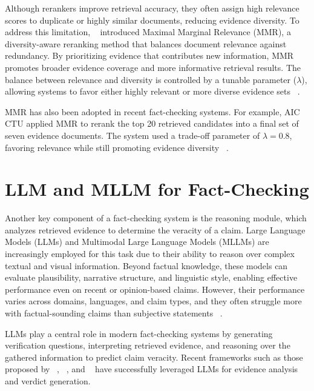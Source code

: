 Although rerankers improve retrieval accuracy, they often assign high relevance scores to duplicate or highly similar documents, reducing evidence diversity. To address this limitation, ~\citet{Carbonell1998Aug} introduced Maximal Marginal Relevance (MMR), a diversity-aware reranking method that balances document relevance against redundancy. By prioritizing evidence that contributes new information, MMR promotes broader evidence coverage and more informative retrieval results. The balance between relevance and diversity is controlled by a tunable parameter ($\lambda$), allowing systems to favor either highly relevant or more diverse evidence sets ~\cite{Ullrich2024Nov}.


MMR has also been adopted in recent fact-checking systems. For example, AIC CTU applied MMR to rerank the top 20 retrieved candidates into a final set of seven evidence documents. The system used a trade-off parameter of \(\lambda = 0.8\), favoring relevance while still promoting evidence diversity ~\cite{Ullrich2026Mar}.


\section{LLM and MLLM for Fact-Checking}

Another key component of a fact-checking system is the reasoning module, which analyzes retrieved evidence to determine the veracity of a claim. Large Language Models (LLMs) and Multimodal Large Language Models (MLLMs) are increasingly employed for this task due to their ability to reason over complex textual and visual information. Beyond factual knowledge, these models can evaluate plausibility, narrative structure, and linguistic style, enabling effective performance even on recent or opinion-based claims. However, their performance varies across domains, languages, and claim types, and they often struggle more with factual-sounding claims than subjective statements ~\cite{Tang2024Nov}.

LLMs play a central role in modern fact-checking systems by generating verification questions, interpreting retrieved evidence, and reasoning over the gathered information to predict claim veracity. Recent frameworks such as those proposed by ~\citet{Schlichtkrull2023May}, ~\citet{Ullrich2024Nov}, and ~\citet{Ullrich2025Aug} have successfully leveraged LLMs for evidence analysis and verdict generation.

